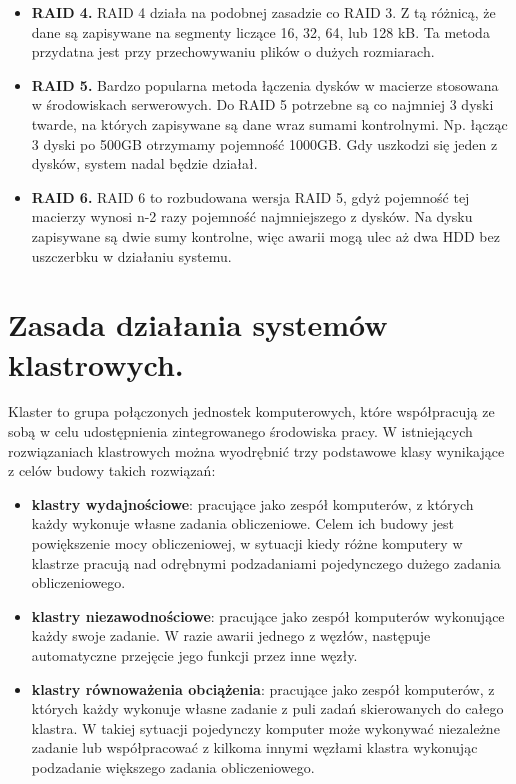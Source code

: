 \documentclass[12pt,a4paper]{article}
\begin{document}
\begin{itemize}
		\item \textbf{RAID 4.} RAID 4 działa na podobnej zasadzie co RAID 3. Z tą różnicą, że dane są zapisywane na segmenty liczące 16, 32, 64, lub 128 kB. Ta metoda przydatna jest przy przechowywaniu plików o dużych rozmiarach.
		\item \textbf{RAID 5.} Bardzo popularna metoda łączenia dysków w macierze stosowana w środowiskach serwerowych. Do RAID 5 potrzebne są co najmniej 3 dyski twarde, na których zapisywane są dane wraz sumami kontrolnymi. Np. łącząc 3 dyski po 500GB otrzymamy pojemność 1000GB. Gdy uszkodzi się jeden z dysków, system nadal będzie działał.
		\item \textbf{RAID 6.} RAID 6 to rozbudowana wersja RAID 5, gdyż pojemność tej macierzy wynosi n-2 razy pojemność najmniejszego z dysków. Na dysku zapisywane są dwie sumy kontrolne, więc awarii mogą ulec aż dwa HDD bez uszczerbku w działaniu systemu.
	\end{itemize}

	\section{Zasada działania systemów klastrowych.}
	Klaster to grupa połączonych jednostek komputerowych, które współpracują ze sobą w celu udostępnienia zintegrowanego środowiska pracy. W istniejących rozwiązaniach klastrowych można wyodrębnić trzy podstawowe klasy wynikające z celów budowy takich rozwiązań:
	
	\begin{itemize}
		\item \textbf{klastry wydajnościowe}: pracujące jako zespół komputerów, z których każdy wykonuje własne zadania obliczeniowe. Celem ich budowy jest powiększenie mocy obliczeniowej, w sytuacji kiedy różne komputery w klastrze pracują nad odrębnymi podzadaniami pojedynczego dużego zadania obliczeniowego.
	
		\item \textbf{klastry niezawodnościowe}: pracujące jako zespół komputerów wykonujące każdy swoje zadanie. W razie awarii jednego z węzłów, następuje automatyczne przejęcie jego funkcji przez inne węzły.
		
		\item \textbf{klastry równoważenia obciążenia}: pracujące jako zespół komputerów, z których każdy wykonuje własne zadanie z puli zadań skierowanych do całego klastra. W takiej sytuacji pojedynczy komputer może wykonywać niezależne zadanie lub współpracować z kilkoma innymi węzłami klastra wykonując podzadanie większego zadania obliczeniowego.
	\end{itemize}
	
\end{document}
